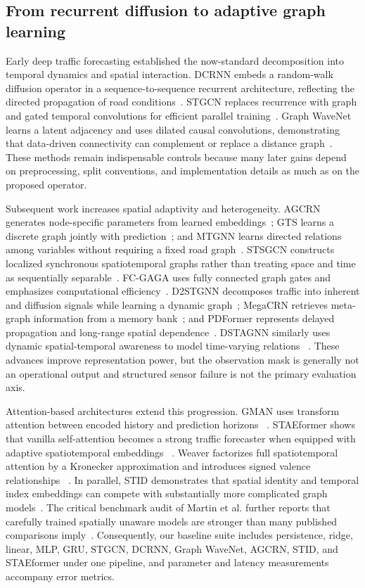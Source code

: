 \documentclass[pdflatex,sn-mathphys-num]{sn-jnl}
\begin{document}
\subsection{From recurrent diffusion to adaptive graph learning}
Early deep traffic forecasting established the now-standard decomposition into
temporal dynamics and spatial interaction. DCRNN embeds a random-walk diffusion
operator in a sequence-to-sequence recurrent architecture, reflecting the
directed propagation of road conditions~\cite{li2018dcrnn}. STGCN replaces
recurrence with graph and gated temporal convolutions for efficient parallel
training~\cite{yu2018stgcn}. Graph WaveNet learns a latent adjacency and uses
dilated causal convolutions, demonstrating that data-driven connectivity can
complement or replace a distance graph~\cite{wu2019graphwavenet}. These methods
remain indispensable controls because many later gains depend on preprocessing,
split conventions, and implementation details as much as on the proposed
operator.

Subsequent work increases spatial adaptivity and heterogeneity. AGCRN generates
node-specific parameters from learned embeddings~\cite{bai2020agcrn}; GTS
learns a discrete graph jointly with prediction~\cite{shang2021gts}; and MTGNN
learns directed relations among variables without requiring a fixed road
graph~\cite{wu2020mtgnn}. STSGCN constructs localized synchronous
spatiotemporal graphs rather than treating space and time as sequentially
separable~\cite{song2020stsgcn}. FC-GAGA uses fully connected graph gates and
emphasizes computational efficiency~\cite{oreshkin2021fcgaga}. D2STGNN
decomposes traffic into inherent and diffusion signals while learning a dynamic
graph~\cite{shao2022d2stgnn}; MegaCRN retrieves meta-graph information from a
memory bank~\cite{jiang2023megacrn}; and PDFormer represents delayed propagation
and long-range spatial dependence~\cite{jiang2023pdformer}. DSTAGNN similarly
uses dynamic spatial-temporal awareness to model time-varying relations
~\cite{lan2022dstagnn}. These advances improve representation power, but the
observation mask is generally not an operational output and structured sensor
failure is not the primary evaluation axis.

Attention-based architectures extend this progression. GMAN uses transform
attention between encoded history and prediction horizons
~\cite{zheng2020gman}. STAEformer shows that vanilla self-attention becomes a
strong traffic forecaster when equipped with adaptive spatiotemporal embeddings
~\cite{liu2023staeformer}. Weaver factorizes full spatiotemporal attention by a
Kronecker approximation and introduces signed valence relationships
~\cite{cheong2026weaver}. In parallel, STID demonstrates that spatial identity
and temporal index embeddings can compete with substantially more complicated
graph models~\cite{shao2022stid}. The critical benchmark audit of Martin et al.
further reports that carefully trained spatially unaware models are stronger
than many published comparisons imply~\cite{martin2026audit}. Consequently, our
baseline suite includes persistence, ridge, linear, MLP, GRU, STGCN, DCRNN,
Graph WaveNet, AGCRN, STID, and STAEformer under one pipeline, and parameter and
latency measurements accompany error metrics.
\end{document}
